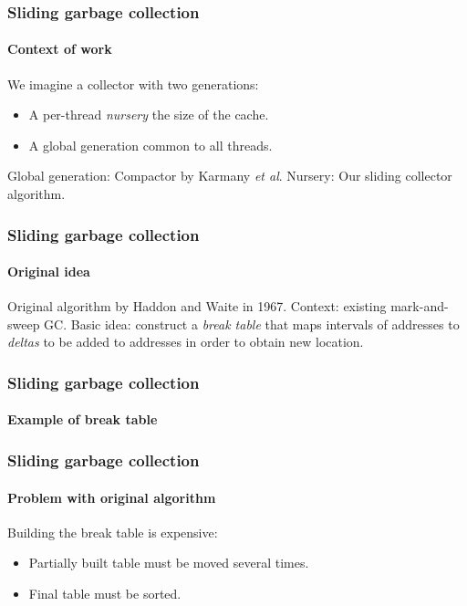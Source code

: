 \documentclass{beamer}
\def\inputfig#1{}
\begin{document}
\begin{frame}
  \frametitle{Sliding garbage collection}
  \framesubtitle{Context of work}

  We imagine a collector with two generations:

  \begin{itemize}
  \item A per-thread \emph{nursery} the size of the cache.
  \item A global generation common to all threads.
  \end{itemize}

Global generation: Compactor by Karmany \emph{et al}.
\vskip 0.25cm
Nursery: Our sliding collector algorithm.

\end{frame}
\begin{frame}
  \frametitle{Sliding garbage collection} 
  \framesubtitle{Original idea}

  Original algorithm by Haddon and Waite in 1967.
  \vskip 0.5cm
  Context: existing mark-and-sweep GC.
  \vskip 0.5cm
  Basic idea: construct a \emph{break table} that maps intervals of
  addresses to \emph{deltas} to be added to addresses in order to
  obtain new location. 

\end{frame}
\begin{frame}
  \frametitle{Sliding garbage collection} 
  \framesubtitle{Example of break table}
  \begin{center}
\inputfig{fig-example-aa.pdf_t}
  \end{center}

  \begin{center}
\inputfig{fig-example-da.pdf_t}
  \end{center}

\end{frame}
\begin{frame}
  \frametitle{Sliding garbage collection} 
  \framesubtitle{Problem with original algorithm}

    Building the break table is expensive:

    \begin{itemize}
    \item Partially built table must be moved several times.
    \item Final table must be sorted.  
    \end{itemize}

\end{frame}
\end{document}
